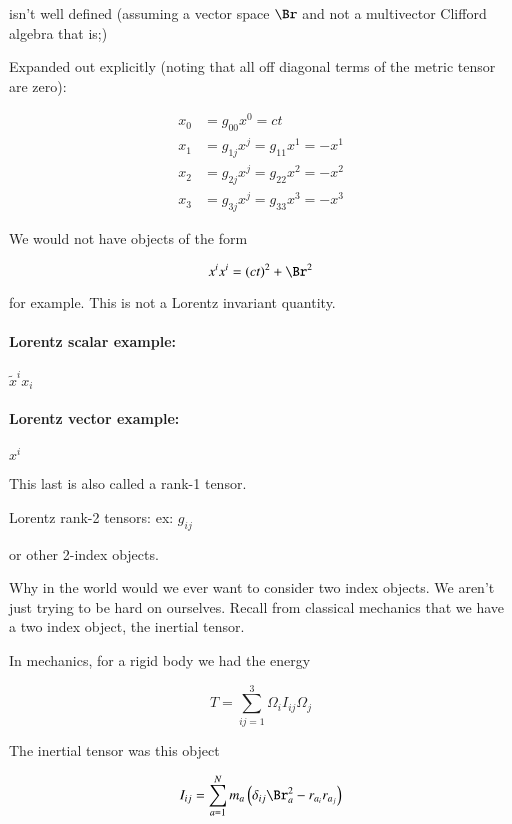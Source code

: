 isn't well defined (assuming a vector space $\Br$ and not a multivector Clifford algebra that is;)

Expanded out explicitly (noting that all off diagonal terms of the metric tensor are zero):

\begin{align*}
x_0 &= g_{0 0} x^0 = ct  \\
x_1 &= g_{1 j} x^j = g_{11} x^1 = -x^1 \\
x_2 &= g_{2 j} x^j = g_{22} x^2 = -x^2 \\
x_3 &= g_{3 j} x^j = g_{33} x^3 = -x^3
\end{align*}

We would not have objects of the form 

\begin{equation}\label{eqn:relativisticElectrodynamicsL6:190}
x^i x^i = (ct)^2 + \Br^2
\end{equation}

for example.  This is not a Lorentz invariant quantity.

\paragraph{Lorentz scalar example:} $\tilde{x}^i x_i$
\paragraph{Lorentz vector example:} $x^i$

This last is also called a rank-1 tensor.

Lorentz rank-2 tensors: ex: $g_{ij}$

or other 2-index objects.

Why in the world would we ever want to consider two index objects.  We aren't just trying to be hard on ourselves.  Recall from classical mechanics that we have a two index object, the inertial tensor.

In mechanics, for a rigid body we had the energy

\begin{equation}\label{eqn:relativisticElectrodynamicsL6:200}
T = \sum_{ij = 1}^3 \Omega_i I_{ij} \Omega_j
\end{equation}

The inertial tensor was this object 

\begin{equation}\label{eqn:relativisticElectrodynamicsL6:210}
I_{ij} = \sum_{a = 1}^N m_a \left(\delta_{ij} \Br_a^2 - r_{a_i} r_{a_j} \right)
\end{equation}

